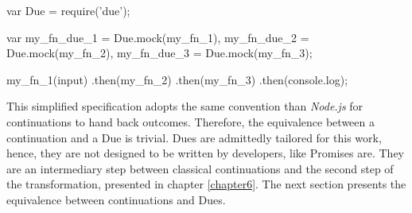 \begin{code}[js, %
             caption={Dues are chained like Promises}, %
             label={lst:dues-sequence}] %
var Due = require('due');

var my_fn_due_1 = Due.mock(my_fn_1),
    my_fn_due_2 = Due.mock(my_fn_2),
    my_fn_due_3 = Due.mock(my_fn_3);

my_fn_1(input)
.then(my_fn_2)
.then(my_fn_3)
.then(console.log);
\end{code}

This simplified specification adopts the same convention than \textit{Node.js} for continuations to hand back outcomes.
Therefore, the equivalence between a continuation and a Due is trivial.
Dues are admittedly tailored for this work, hence, they are not designed to be written by developers, like Promises are.
They are an intermediary step between classical continuations and the second step of the transformation, presented in chapter \ref{chapter6}.
The next section presents the equivalence between continuations and Dues.


